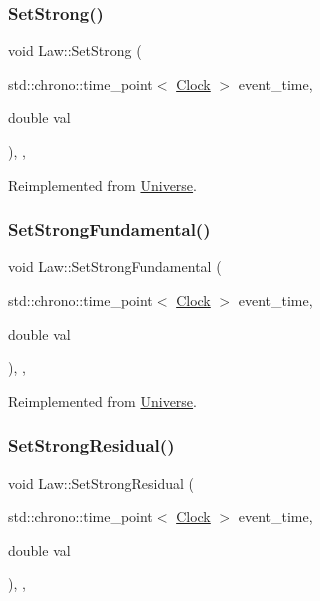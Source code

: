 \subsubsection{\texorpdfstring{Set\+Strong()}{SetStrong()}}
{\footnotesize\ttfamily void Law\+::\+Set\+Strong (\begin{DoxyParamCaption}\item[{std\+::chrono\+::time\+\_\+point$<$ \mbox{\hyperlink{universe_8h_a0ef8d951d1ca5ab3cfaf7ab4c7a6fd80}{Clock}} $>$}]{event\+\_\+time,  }\item[{double}]{val }\end{DoxyParamCaption})\hspace{0.3cm}{\ttfamily [inline]}, {\ttfamily [final]}, {\ttfamily [virtual]}}



Reimplemented from \mbox{\hyperlink{classUniverse_a5946c8f3d4cda305f3ecd10df21a2f94}{Universe}}.

\mbox{\label{classLaw_a4a7c8caa24acf453c1a8782a1ec4acf4}} 
\subsubsection{\texorpdfstring{Set\+Strong\+Fundamental()}{SetStrongFundamental()}}
{\footnotesize\ttfamily void Law\+::\+Set\+Strong\+Fundamental (\begin{DoxyParamCaption}\item[{std\+::chrono\+::time\+\_\+point$<$ \mbox{\hyperlink{universe_8h_a0ef8d951d1ca5ab3cfaf7ab4c7a6fd80}{Clock}} $>$}]{event\+\_\+time,  }\item[{double}]{val }\end{DoxyParamCaption})\hspace{0.3cm}{\ttfamily [inline]}, {\ttfamily [final]}, {\ttfamily [virtual]}}



Reimplemented from \mbox{\hyperlink{classUniverse_aafec97a231126b71c73ac1258609a284}{Universe}}.

\mbox{\label{classLaw_ad4a05c77d11ddec40b1e07246cac449d}} 
\subsubsection{\texorpdfstring{Set\+Strong\+Residual()}{SetStrongResidual()}}
{\footnotesize\ttfamily void Law\+::\+Set\+Strong\+Residual (\begin{DoxyParamCaption}\item[{std\+::chrono\+::time\+\_\+point$<$ \mbox{\hyperlink{universe_8h_a0ef8d951d1ca5ab3cfaf7ab4c7a6fd80}{Clock}} $>$}]{event\+\_\+time,  }\item[{double}]{val }\end{DoxyParamCaption})\hspace{0.3cm}{\ttfamily [inline]}, {\ttfamily [final]}, {\ttfamily [virtual]}}



